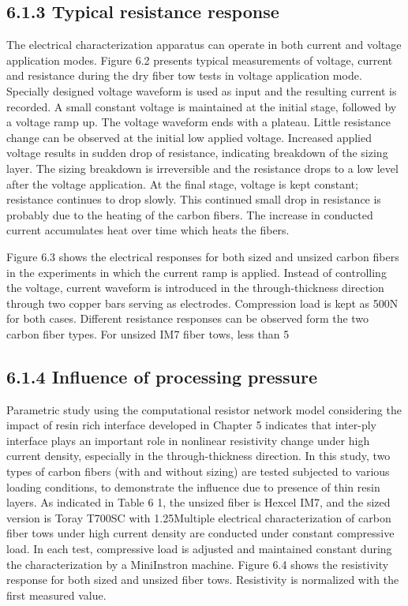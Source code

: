 \subsection{6.1.3	Typical resistance response }
The electrical characterization apparatus can operate in both current and voltage application modes. Figure 6.2 presents typical measurements of voltage, current and resistance during the dry fiber tow tests in voltage application mode. Specially designed voltage waveform is used as input and the resulting current is recorded. A small constant voltage is maintained at the initial stage, followed by a voltage ramp up. The voltage waveform ends with a plateau.
 Little resistance change can be observed at the initial low applied voltage. Increased applied voltage results in sudden drop of resistance, indicating breakdown of the sizing layer. The sizing breakdown is irreversible and the resistance drops to a low level after the voltage application. At the final stage, voltage is kept constant; resistance continues to drop slowly. This continued small drop in resistance is probably due to the heating of the carbon fibers.  The increase in conducted current accumulates heat over time which heats the fibers. 
 
 
Figure 6.3 shows the electrical responses for both sized and unsized carbon fibers in the experiments in which the current ramp is applied. Instead of controlling the voltage, current waveform is introduced in the through-thickness direction through two copper bars serving as electrodes. Compression load is kept as 500N for both cases. 
Different resistance responses can be observed form the two carbon fiber types. For unsized IM7 fiber tows, less than 5

\subsection{6.1.4	Influence of processing pressure}
Parametric study using the computational resistor network model considering the impact of resin rich interface developed in Chapter 5 indicates that inter-ply interface plays an important role in nonlinear resistivity change under high current density, especially in the through-thickness direction. In this study, two types of carbon fibers (with and without sizing) are tested subjected to various loading conditions, to demonstrate the influence due to presence of thin resin layers. As indicated in Table 6 1, the unsized fiber is Hexcel IM7, and the sized version is Toray T700SC with 1.25Multiple electrical characterization of carbon fiber tows under high current density are conducted under constant compressive load. In each test, compressive load is adjusted and maintained constant during the characterization by a MiniInstron machine. Figure 6.4 shows the resistivity response for both sized and unsized fiber tows. Resistivity is normalized with the first measured value. 
 
